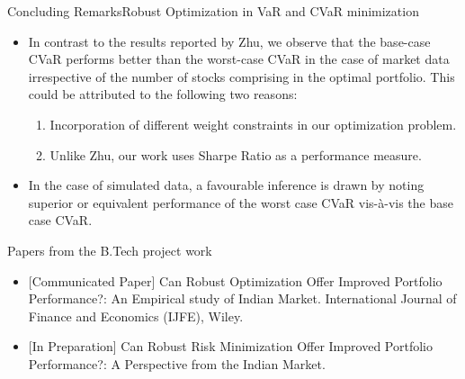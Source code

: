 \documentclass{beamer}
\begin{document}
\begin{frame}{Concluding Remarks}{Robust Optimization in VaR and CVaR minimization}
\begin{itemize}
    \item{In contrast to the results reported by Zhu, we observe that the base-case CVaR performs better than the worst-case CVaR in the case of market data irrespective of the number of stocks comprising in the optimal portfolio. This could be attributed to the following two reasons:
    \begin{enumerate}
        \item Incorporation of different weight constraints in our optimization problem.
        \item Unlike Zhu, our work uses Sharpe Ratio as a performance measure.
    \end{enumerate}}
    \item{In the case of simulated data, a favourable inference is drawn by noting superior or equivalent performance of the worst case CVaR vis-\`a-vis the base case CVaR.}
\end{itemize}
\end{frame}


\begin{frame}{Papers from the B.Tech project work}
    \begin{itemize}
        \item{ [Communicated Paper] Can Robust Optimization Offer Improved Portfolio Performance?: An Empirical study of Indian Market. International Journal of Finance and Economics (IJFE), Wiley.}
        \item{ [In Preparation] Can Robust Risk Minimization Offer Improved Portfolio Performance?: A Perspective from the Indian Market.}
        
    \end{itemize}
\end{frame}











\end{document}

